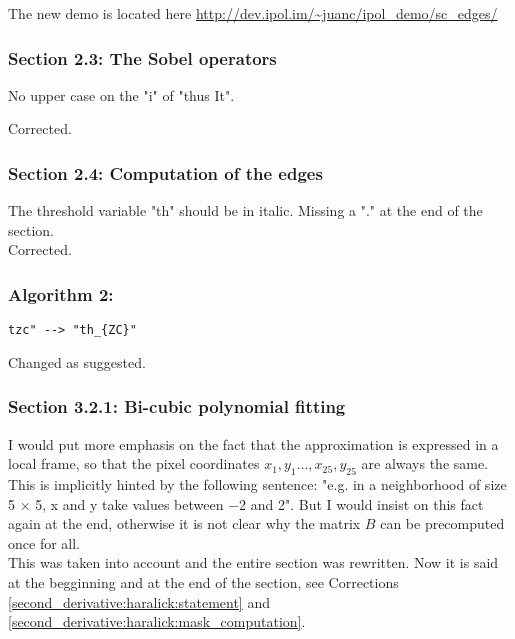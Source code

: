 \documentclass[a4paper,10pt]{report}
\begin{document}
\ans The new demo is located  here \url{http://dev.ipol.im/~juanc/ipol_demo/sc_edges/}\\

\subsubsection{ Section 2.3: The Sobel operators}
\que No upper case on the "i" of "thus It".

\ans Corrected.\\

\subsubsection{Section 2.4: Computation of the edges}
\que The threshold variable "th" should be in italic.
Missing a "." at the end of the section.\\

\ans Corrected.\\

\subsubsection{Algorithm 2:}
\que
\begin{verbatim}
tzc" --> "th_{ZC}"
\end{verbatim}

\ans Changed as suggested.\\

\subsubsection{ Section 3.2.1: Bi-cubic polynomial fitting}

\que I would put more emphasis on the fact that the approximation is expressed in a
local frame, so that the pixel coordinates $x_1,y_1\dots,x_{25},y_{25}$ are
always the same. This is implicitly hinted by the following sentence:
"e.g. in a neighborhood of size 5 × 5, x and y take values between −2 and 2".
But I would insist on this fact again at the end, otherwise it is not clear why
the matrix $B$ can be precomputed once for all.\\

\ans This was taken into account and the entire section was rewritten. Now it is said at the begginning and at the end of the section, see Corrections \ref{second_derivative:haralick:statement} and \ref{second_derivative:haralick:mask_computation}.\\
\end{document}
